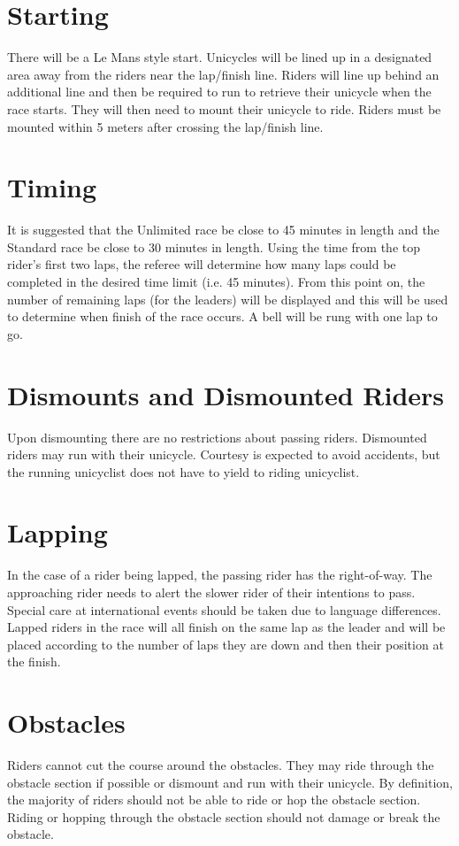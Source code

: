 \section{Starting}
There will be a Le Mans style start.
Unicycles will be lined up in a designated area away from the riders near the lap/finish line.
Riders will line up behind an additional line and then be required to run to retrieve their unicycle when the race starts.
They will then need to mount their unicycle to ride.
Riders must be mounted within 5 meters after crossing the lap/finish line.

\section{Timing}
It is suggested that the Unlimited race be close to 45 minutes in length and the Standard race be close to 30 minutes in length.
Using the time from the top rider's first two laps, the referee will determine how many laps could be completed in the desired time limit (i.e. 45 minutes).
From this point on, the number of remaining laps (for the leaders) will be displayed and this will be used to determine when finish of the race occurs. A bell will be rung with one lap to go.

\section{Dismounts and Dismounted Riders}
Upon dismounting there are no restrictions about passing riders.
Dismounted riders may run with their unicycle.
Courtesy is expected to avoid accidents, but the running unicyclist does not have to yield to riding unicyclist.

\section{Lapping}
In the case of a rider being lapped, the passing rider has the right-of-way.
The approaching rider needs to alert the slower rider of their intentions to pass.
Special care at international events should be taken due to language differences.
Lapped riders in the race will all finish on the same lap as the leader and will be placed according to the number of laps they are down and then their position at the finish.

\section{Obstacles}
Riders cannot cut the course around the obstacles.
They may ride through the obstacle section if possible or dismount and run with their unicycle.
By definition, the majority of riders should not be able to ride or hop the obstacle section.
Riding or hopping through the obstacle section should not damage or break the obstacle.

